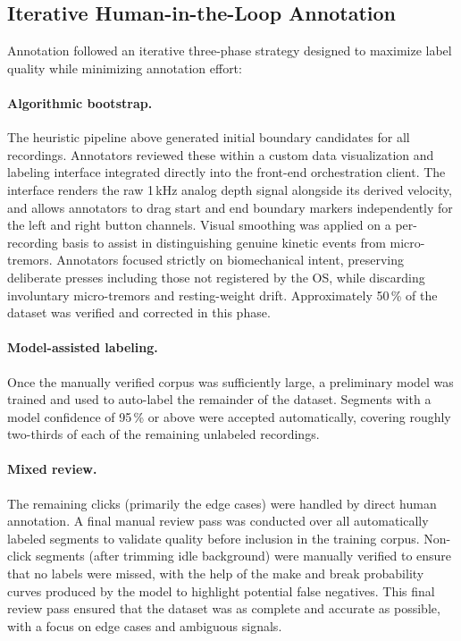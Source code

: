 \subsection{Iterative Human-in-the-Loop Annotation}
Annotation followed an iterative three-phase strategy designed to maximize label quality while minimizing annotation effort:

\paragraph{Algorithmic bootstrap.} The heuristic pipeline above generated initial boundary candidates for all recordings. Annotators reviewed these within a custom data visualization and labeling interface integrated directly into the front-end orchestration client. The interface renders the raw 1\,kHz analog depth signal alongside its derived velocity, and allows annotators to drag start and end boundary markers independently for the left and right button channels. Visual smoothing was applied on a per-recording basis to assist in distinguishing genuine kinetic events from micro-tremors. Annotators focused strictly on biomechanical intent, preserving deliberate presses including those not registered by the OS, while discarding involuntary micro-tremors and resting-weight drift. Approximately 50\,\% of the dataset was verified and corrected in this phase.

\paragraph{Model-assisted labeling.} Once the manually verified corpus was sufficiently large, a preliminary model was trained and used to auto-label the remainder of the dataset. Segments with a model confidence of 95\,\% or above were accepted automatically, covering roughly two-thirds of each of the remaining unlabeled recordings.

\paragraph{Mixed review.} The remaining clicks (primarily the edge cases) were handled by direct human annotation. A final manual review pass was conducted over all automatically labeled segments to validate quality before inclusion in the training corpus. Non-click segments (after trimming idle background) were manually verified to ensure that no labels were missed, with the help of the make and break probability curves produced by the model to highlight potential false negatives. This final review pass ensured that the dataset was as complete and accurate as possible, with a focus on edge cases and ambiguous signals.

